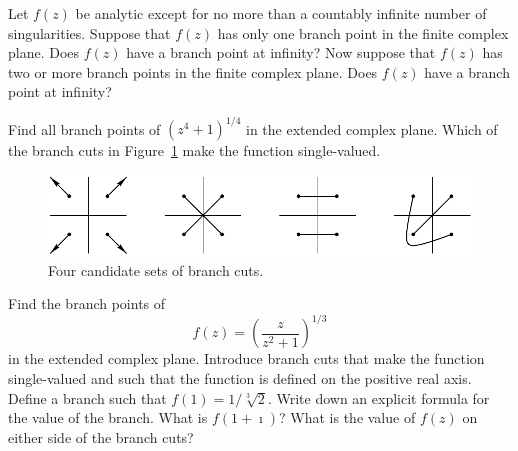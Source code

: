 {%
\begin{Exercise}
  \label{exercise bp inf 2}
  Let $f(z)$ be analytic except for no more than a countably infinite number
  of singularities.  Suppose that $f(z)$ has only one branch point in the
  finite complex plane.  Does $f(z)$ have a branch point at infinity?
  Now suppose that $f(z)$ has two or more branch points in the finite
  complex plane.  Does $f(z)$ have a branch point at infinity?

\end{Exercise}





\begin{Exercise}
  \label{exercise z4114}
  Find all branch points of $\left( z^4 + 1 \right)^{1/4}$ in the extended 
  complex plane.
  Which of the branch cuts in Figure~\ref{fourbc} make the function 
  single-valued.
  \begin{figure}[htbp!]
    \begin{center}
      \includegraphics[width=\textwidth]{fcv/function/fourbc}
    \end{center}
    \caption{Four candidate sets of branch cuts.}
    \label{fourbc}
  \end{figure}

\end{Exercise}






\begin{Exercise}
  \label{exercise zz21}
  Find the branch points of
  \[
  f(z) = \left( \frac{z}{z^2 + 1} \right)^{1/3}
  \]
  in the extended complex plane.  Introduce branch cuts that make the function
  single-valued and such that the function is defined on the positive
  real axis.  Define a branch such that $f(1) = 1 / \sqrt[3]{2}$.  Write
  down an explicit formula for the value of the branch.  What is $f(1 + \imath)$?
  What is the value of $f(z)$ on either side of the branch cuts?

\end{Exercise}







}
